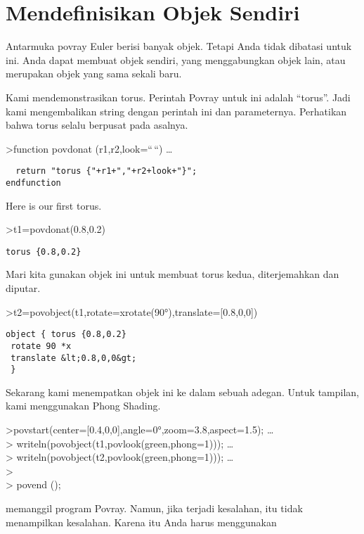 \documentclass[
]{book}
\begin{document}
\chapter{Mendefinisikan Objek Sendiri}\label{mendefinisikan-objek-sendiri}

Antarmuka povray Euler berisi banyak objek. Tetapi Anda tidak dibatasi untuk ini. Anda dapat membuat objek sendiri, yang menggabungkan objek lain, atau merupakan objek yang sama sekali baru.

Kami mendemonstrasikan torus. Perintah Povray untuk ini adalah ``torus''. Jadi kami mengembalikan string dengan perintah ini dan parameternya. Perhatikan bahwa torus selalu berpusat pada asalnya.

\textgreater function povdonat (r1,r2,look=``\,``) \ldots{}

\begin{verbatim}
  return "torus {"+r1+","+r2+look+"}";
endfunction
\end{verbatim}

Here is our first torus.

\textgreater t1=povdonat(0.8,0.2)

\begin{verbatim}
torus {0.8,0.2}
\end{verbatim}

Mari kita gunakan objek ini untuk membuat torus kedua, diterjemahkan dan diputar.

\textgreater t2=povobject(t1,rotate=xrotate(90°),translate={[}0.8,0,0{]})

\begin{verbatim}
object { torus {0.8,0.2}
 rotate 90 *x 
 translate &lt;0.8,0,0&gt;
 }
\end{verbatim}

Sekarang kami menempatkan objek ini ke dalam sebuah adegan. Untuk tampilan, kami menggunakan Phong Shading.

\textgreater povstart(center={[}0.4,0,0{]},angle=0°,zoom=3.8,aspect=1.5); \ldots{}\\
\textgreater{} writeln(povobject(t1,povlook(green,phong=1))); \ldots{}\\
\textgreater{} writeln(povobject(t2,povlook(green,phong=1))); \ldots{}\\
\textgreater{}\\
\textgreater{} povend ();

memanggil program Povray. Namun, jika terjadi kesalahan, itu tidak menampilkan kesalahan. Karena itu Anda harus menggunakan
\end{document}
